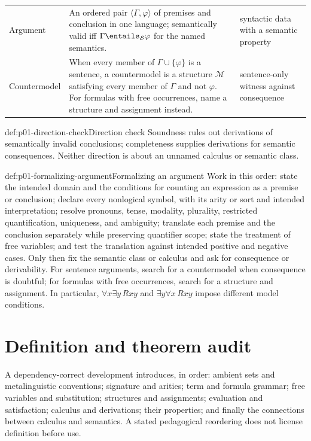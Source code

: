 \begin{longtable}{@{}p{}p{}p{}@{}}
Argument\index{argument} & An ordered pair \(\langle\Gamma,\varphi\rangle\)
of premises and conclusion in one language; semantically valid iff
\(\Gamma\entails_{\mathcal S}\varphi\) for the named semantics. & syntactic
data with a semantic property \\
Countermodel\index{countermodel} & When every member of
\(\Gamma\cup\{\varphi\}\) is a sentence, a countermodel is a structure
\(\mathcal M\) satisfying every member of \(\Gamma\) and not
\(\varphi\).  For formulas with free occurrences, name a structure and
assignment instead. & sentence-only witness against consequence \\
\bottomrule
\end{longtable}
\endgroup

\begin{hbwarning}{def:p01-direction-check}{Direction check}
Soundness rules out derivations of semantically invalid conclusions;
completeness supplies derivations for semantic consequences.  Neither
direction is about an unnamed calculus or semantic class.
\end{hbwarning}

\begin{hbmethod}{def:p01-formalizing-argument}{Formalizing an argument}
Work in this order: state the intended domain and the conditions for counting
an expression as a premise or conclusion; declare every nonlogical symbol,
with its arity or sort and intended interpretation; resolve pronouns, tense,
modality, plurality, restricted quantification, uniqueness, and ambiguity;
translate each premise and the conclusion separately while preserving
quantifier scope; state the treatment of free variables; and test the
translation against intended positive and negative cases.  Only then fix the
semantic class or calculus and ask for consequence or derivability.  For
sentence arguments, search for a countermodel when consequence is doubtful;
for formulas with free occurrences, search for a structure and assignment.
In particular, \(\forall x\exists y\,Rxy\) and
\(\exists y\forall x\,Rxy\) impose different model conditions.
\end{hbmethod}

\section{Definition and theorem audit}
\label{sec:p01-definition-proof-audit}

A dependency-correct development introduces, in order: ambient sets and
metalinguistic conventions; signature and arities; term and formula grammar;
free variables and substitution; structures and assignments; evaluation and
satisfaction; calculus and derivations; their properties; and finally the
connections between calculus and semantics.  A stated pedagogical reordering
does not license definition before use.

